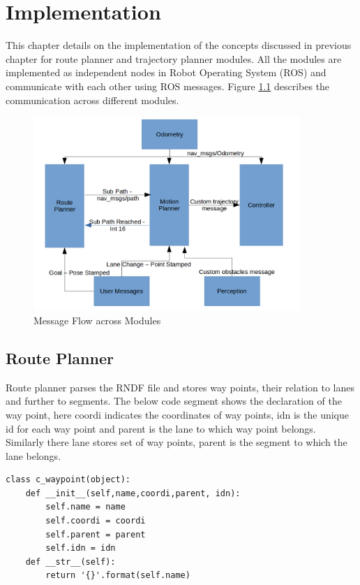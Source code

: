 \chapter{Implementation}
\label{implementation}
This chapter details on the implementation of the concepts discussed in previous chapter for route planner and trajectory planner modules. All the modules are implemented as independent nodes in Robot Operating System (ROS) and communicate with each other using ROS messages. Figure \ref{message_flow} describes the communication across different modules. 

\begin{figure}[H]
	\centering
	\includegraphics[width=0.9\textwidth]{Images/implementation/message_flow.png}
	\caption{Message Flow across Modules}
	\label{message_flow}
\end{figure}


\section{Route Planner}
Route planner parses the RNDF file and stores way points, their relation to lanes and further to segments. The below code segment shows the declaration of the way point, here coordi indicates the coordinates of way points, idn is the unique id for each way point and parent is the lane to which way point belongs. Similarly there lane stores set of way points, parent is the segment to which the lane belongs. 

\begin{lstlisting}
class c_waypoint(object):
	def __init__(self,name,coordi,parent, idn):
		self.name = name
		self.coordi = coordi
		self.parent = parent
		self.idn = idn
	def __str__(self):
		return '{}'.format(self.name)

\end{lstlisting}

